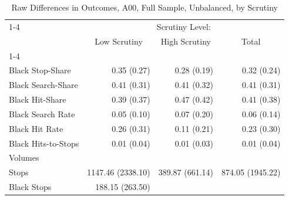 \begin{table}[!h]
\caption{Raw Differences in Outcomes, A00, Full Sample, Unbalanced, by Scrutiny}
\centering
\begin{tabular}{llll}
\cline{1-4}
\multicolumn{1}{r}{} &
  \multicolumn{3}{c}{Scrutiny Level:} \\
\multicolumn{1}{r}{} &
  \multicolumn{1}{c}{Low Scrutiny} &
  \multicolumn{1}{c}{High Scrutiny} &
  \multicolumn{1}{c}{Total} \\
\cline{1-4}
\multicolumn{1}{l}{Rates} &
  \multicolumn{1}{r}{} &
  \multicolumn{1}{r}{} &
  \multicolumn{1}{r}{} \\
\multicolumn{1}{l}{\hspace{1em}Black Stop-Share} &
  \multicolumn{1}{r}{0.35 (0.27)} &
  \multicolumn{1}{r}{0.28 (0.19)} &
  \multicolumn{1}{r}{0.32 (0.24)} \\
\multicolumn{1}{l}{\hspace{1em}Black Search-Share} &
  \multicolumn{1}{r}{0.41 (0.31)} &
  \multicolumn{1}{r}{0.41 (0.32)} &
  \multicolumn{1}{r}{0.41 (0.31)} \\
\multicolumn{1}{l}{\hspace{1em}Black Hit-Share} &
  \multicolumn{1}{r}{0.39 (0.37)} &
  \multicolumn{1}{r}{0.47 (0.42)} &
  \multicolumn{1}{r}{0.41 (0.38)} \\
\multicolumn{1}{l}{\hspace{1em}Black Search Rate} &
  \multicolumn{1}{r}{0.05 (0.10)} &
  \multicolumn{1}{r}{0.07 (0.20)} &
  \multicolumn{1}{r}{0.06 (0.14)} \\
\multicolumn{1}{l}{\hspace{1em}Black Hit Rate} &
  \multicolumn{1}{r}{0.26 (0.31)} &
  \multicolumn{1}{r}{0.11 (0.21)} &
  \multicolumn{1}{r}{0.23 (0.30)} \\
\multicolumn{1}{l}{\hspace{1em}Black Hits-to-Stops} &
  \multicolumn{1}{r}{0.01 (0.04)} &
  \multicolumn{1}{r}{0.01 (0.03)} &
  \multicolumn{1}{r}{0.01 (0.04)} \\
\multicolumn{1}{l}{Volumes} &
  \multicolumn{1}{r}{} &
  \multicolumn{1}{r}{} &
  \multicolumn{1}{r}{} \\
\multicolumn{1}{l}{\hspace{1em}Stops} &
  \multicolumn{1}{r}{1147.46 (2338.10)} &
  \multicolumn{1}{r}{389.87 (661.14)} &
  \multicolumn{1}{r}{874.05 (1945.22)} \\
\multicolumn{1}{l}{\hspace{1em}Black Stops} &
  \multicolumn{1}{r}{188.15 (263.50)} &

\end{tabular}
\end{table}
